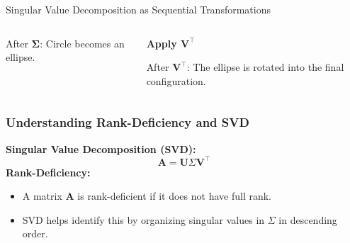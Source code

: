 \documentclass[aspectratio=169]{beamer}
\begin{document}
\begin{frame}{Singular Value Decomposition as Sequential Transformations}
\begin{columns}
\begin{column}{0.3\textwidth}
      
      {\footnotesize After \( \mathbf{\Sigma} \): Circle becomes an ellipse.}
    \end{column}
    \pause
    \begin{column}{0.3\textwidth}
      \centering
      \textbf{Apply \( \mathbf{V}^\top \)}\\[0.5cm]
      
      
      {\footnotesize After \( \mathbf{V}^\top \): The ellipse is rotated into the final configuration.}
    \end{column}
  \end{columns}

\end{frame}


\begin{frame}
\frametitle{Understanding Rank-Deficiency and SVD}
\textbf{Singular Value Decomposition (SVD):}
\[
\mathbf{A} = \mathbf{U} \Sigma \mathbf{V}^\top
\] \pause
\textbf{Rank-Deficiency:}
\begin{itemize}
    \item A matrix \( \mathbf{A} \) is rank-deficient if it does not have full rank.
    \item SVD helps identify this by organizing singular values in \( \Sigma \) in descending order.
\end{itemize}
\end{frame}
\end{document}
